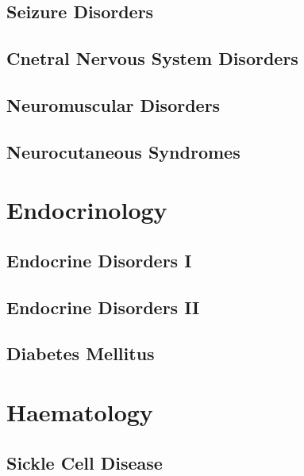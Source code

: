 \documentclass[
  letterpaper,
  DIV=11,
  numbers=noendperiod]{scrreprt}
\begin{document}
\hypertarget{seizure-disorders}{%
\chapter{Seizure Disorders}\label{seizure-disorders}}

\hypertarget{cnetral-nervous-system-disorders}{%
\chapter{Cnetral Nervous System
Disorders}\label{cnetral-nervous-system-disorders}}

\hypertarget{neuromuscular-disorders}{%
\chapter{Neuromuscular Disorders}\label{neuromuscular-disorders}}

\hypertarget{neurocutaneous-syndromes}{%
\chapter{Neurocutaneous Syndromes}\label{neurocutaneous-syndromes}}

\part{{Endocrinology}}

\hypertarget{endocrine-disorders-i}{%
\chapter{Endocrine Disorders I}\label{endocrine-disorders-i}}

\hypertarget{endocrine-disorders-ii}{%
\chapter{Endocrine Disorders II}\label{endocrine-disorders-ii}}

\hypertarget{diabetes-mellitus}{%
\chapter{Diabetes Mellitus}\label{diabetes-mellitus}}

\part{{Haematology}}

\hypertarget{sickle-cell-disease}{%
\chapter{Sickle Cell Disease}\label{sickle-cell-disease}}
\end{document}
